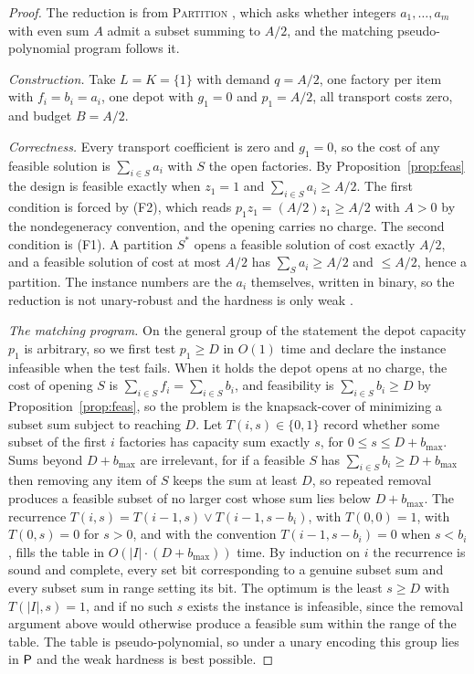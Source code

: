 \begin{proof}
The reduction is from \textsc{Partition}
\citep{Karp1972}, which asks whether
integers $a_1,\dots,a_m$ with even sum $A$ admit a subset summing to
$A/2$, and the matching pseudo-polynomial program follows it.

\emph{Construction.} Take $L=K=\{1\}$ with demand $q=A/2$, one factory
per item with $f_i=b_i=a_i$, one depot with $g_1=0$ and $p_1=A/2$, all
transport costs zero, and budget $B=A/2$.

\emph{Correctness.} Every transport coefficient is zero and $g_1=0$, so
the cost of any feasible solution is $\sum_{i\in S}a_i$ with $S$ the open
factories. By Proposition~\ref{prop:feas} the design is feasible exactly
when $z_1=1$ and $\sum_{i\in S}a_i\ge A/2$. The first condition is
forced by (F2), which reads $p_1z_1=(A/2)z_1\ge A/2$ with $A>0$ by the
nondegeneracy convention, and the opening carries no charge. The second
condition is (F1). A partition $S^\ast$ opens a
feasible solution of cost exactly $A/2$, and a feasible solution of cost
at most $A/2$ has $\sum_S a_i\ge A/2$ and $\le A/2$, hence a partition. The instance
numbers are the $a_i$ themselves, written in binary, so the reduction is
not unary-robust and the hardness is only weak
\citep{GareyJohnson1979}.

\emph{The matching program.} On the general group of the statement the
depot capacity $p_1$ is arbitrary, so we first test $p_1\ge D$ in $O(1)$
time and declare the instance infeasible when the test fails. When it
holds the depot opens at no charge, the cost of opening $S$
is $\sum_{i\in S}f_i=\sum_{i\in S}b_i$, and feasibility is
$\sum_{i\in S}b_i\ge D$ by Proposition~\ref{prop:feas}, so the problem is
the knapsack-cover of minimizing a subset sum subject to reaching $D$.
Let $T(i,s)\in\{0,1\}$ record whether some subset of the first $i$
factories has capacity sum exactly $s$, for $0\le s\le D+b_{\max}$. Sums
beyond $D+b_{\max}$ are irrelevant, for if a feasible $S$ has
$\sum_{i\in S}b_i\ge D+b_{\max}$ then removing any item of $S$ keeps the
sum at least $D$, so repeated removal produces a feasible subset of no
larger cost whose sum lies below $D+b_{\max}$. The recurrence
$T(i,s)=T(i-1,s)\vee T(i-1,s-b_i)$, with $T(0,0)=1$, with $T(0,s)=0$ for
$s>0$, and with the convention $T(i-1,s-b_i)=0$ when $s<b_i$, fills the
table in $O(|I|\cdot(D+b_{\max}))$ time. By induction on $i$ the
recurrence is sound and complete, every set bit corresponding to a
genuine subset sum and every subset sum in range setting its bit. The
optimum is the least $s\ge D$ with $T(|I|,s)=1$, and if no such $s$
exists the instance is infeasible, since the removal argument above
would otherwise produce a feasible sum within the range of the table.
The table
is pseudo-polynomial, so under a unary encoding this group lies in
$\textsf{P}$ and the weak hardness is best possible.
\end{proof}

